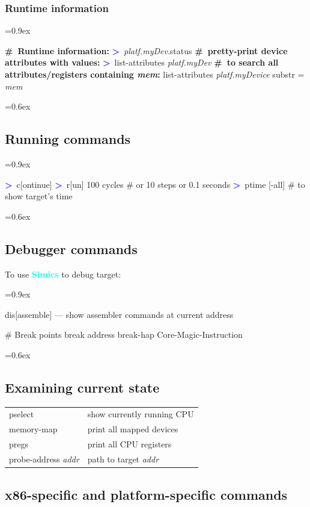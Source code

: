 \documentclass[8pt]{extarticle}
\newenvironment{code}[1][]{%
\begin{prebox}[#1]\obeylines%
\fontdimen2\font=0.9ex%
}{%
\end{prebox}%
\fontdimen2\font=0.6ex%
}
\newcommand{\ind}{\hphantom{~~~}}
\newcommand{\sprompt}{\textcolor{blue}{\textbf{>}\ }}
\newcommand{\cmtcommon}[1]{\textcolor{Sepia}{\textbf{#1}}}
\newcommand{\cmt}[1]{\cmtcommon{\#\ #1}}
\newcommand{\p}[1]{\textit{\large#1}}
\newcommand{\Simics}{\textcolor{cyan}{\textbf{Simics}}}
\begin{document}
\begin{multicols*}{3}
\subsubsection{Runtime information}

\begin{code}
    \cmt{Runtime information:}
    \sprompt \p{platf.myDev}.status
    \cmt{pretty-print device attributes with values:}
    \sprompt list-attributes \p{platf.myDev}
    \cmt{to search all attributes/registers containing \p{mem}:}
    list-attributes \p{platf.myDevice} substr = \p{mem}
\end{code}


\subsection{Running commands}
\begin{code}
\sprompt c[ontinue]
\sprompt r[un] 100 cycles \ind \# or 10 steps or 0.1 seconds
\sprompt ptime [-all] \ind \# to show target's time
\end{code}

\subsection{Debugger commands}
To use \Simics{} to debug target:
\begin{code}
dis[assemble] — show assembler commands at current address

\# Break points
break address
break-hap Core-Magic-Instruction
\end{code}

\subsection{Examining current state}

\begin{tabular}{ll}
    pselect & show currently running CPU \\
    memory-map & print all mapped devices \\
    pregs & print all CPU registers \\
    probe-address \p{addr} & path to target \p{addr}
\end{tabular}

\subsection{x86-specific and platform-specific commands}


\end{multicols*}
\end{document}
